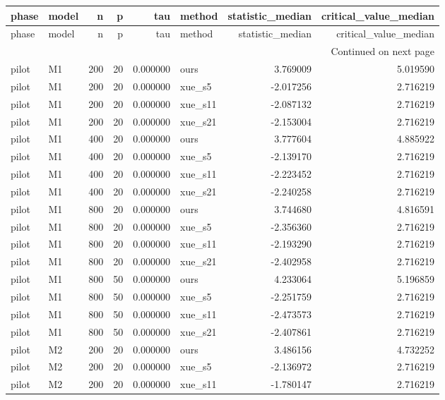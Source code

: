 \begin{longtable}{llrrrlrr}
\toprule
phase & model & n & p & tau & method & statistic\_median & critical\_value\_median \\
\midrule
\endfirsthead
\toprule
phase & model & n & p & tau & method & statistic\_median & critical\_value\_median \\
\midrule
\endhead
\midrule
\multicolumn{8}{r}{Continued on next page} \\
\midrule
\endfoot
\bottomrule
\endlastfoot
pilot & M1 & 200 & 20 & 0.000000 & ours & 3.769009 & 5.019590 \\
pilot & M1 & 200 & 20 & 0.000000 & xue\_s5 & -2.017256 & 2.716219 \\
pilot & M1 & 200 & 20 & 0.000000 & xue\_s11 & -2.087132 & 2.716219 \\
pilot & M1 & 200 & 20 & 0.000000 & xue\_s21 & -2.153004 & 2.716219 \\
pilot & M1 & 400 & 20 & 0.000000 & ours & 3.777604 & 4.885922 \\
pilot & M1 & 400 & 20 & 0.000000 & xue\_s5 & -2.139170 & 2.716219 \\
pilot & M1 & 400 & 20 & 0.000000 & xue\_s11 & -2.223452 & 2.716219 \\
pilot & M1 & 400 & 20 & 0.000000 & xue\_s21 & -2.240258 & 2.716219 \\
pilot & M1 & 800 & 20 & 0.000000 & ours & 3.744680 & 4.816591 \\
pilot & M1 & 800 & 20 & 0.000000 & xue\_s5 & -2.356360 & 2.716219 \\
pilot & M1 & 800 & 20 & 0.000000 & xue\_s11 & -2.193290 & 2.716219 \\
pilot & M1 & 800 & 20 & 0.000000 & xue\_s21 & -2.402958 & 2.716219 \\
pilot & M1 & 800 & 50 & 0.000000 & ours & 4.233064 & 5.196859 \\
pilot & M1 & 800 & 50 & 0.000000 & xue\_s5 & -2.251759 & 2.716219 \\
pilot & M1 & 800 & 50 & 0.000000 & xue\_s11 & -2.473573 & 2.716219 \\
pilot & M1 & 800 & 50 & 0.000000 & xue\_s21 & -2.407861 & 2.716219 \\
pilot & M2 & 200 & 20 & 0.000000 & ours & 3.486156 & 4.732252 \\
pilot & M2 & 200 & 20 & 0.000000 & xue\_s5 & -2.136972 & 2.716219 \\
pilot & M2 & 200 & 20 & 0.000000 & xue\_s11 & -1.780147 & 2.716219 \\

\end{longtable}
